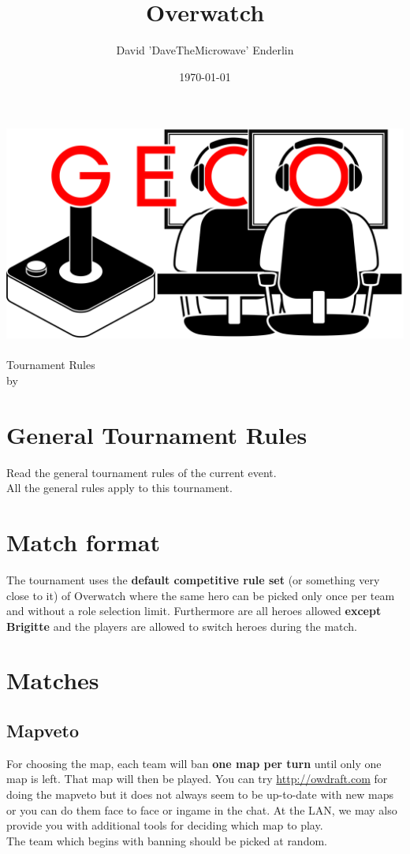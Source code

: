 \documentclass{article}
\title{Overwatch}
\author{David 'DaveTheMicrowave' Enderlin}
\date{\today}
\begin{document}
\makeatletter
\begin{titlepage}
\centering
\includegraphics[scale=0.075]{GECo.png}\\
\LARGE \@title\\ Tournament Rules\\ \normalsize by \@author\\ \@date
\end{titlepage}
\makeatother

\clearpage

\tableofcontents
\clearpage

\section{General Tournament Rules}
Read the general tournament rules of the current event.\\
All the general rules apply to this tournament.

\section{Match format}
The tournament uses the \textbf{default competitive rule set} (or something very close to it) of Overwatch where the same hero can be picked only once per team and without a role selection limit. Furthermore are all heroes allowed \textbf{except Brigitte} and the players are allowed to switch heroes during the match.

\section{Matches}
\subsection{Mapveto}
For choosing the map, each team will ban \textbf{one map per turn} until only one map is left. That map will then be played.
You can try \url{http://owdraft.com} for doing the mapveto but it does not always seem to be up-to-date with new maps
or you can do them face to face or ingame in the chat. At the LAN, we may also provide you with additional tools
for deciding which map to play. \\
The team which begins with banning should be picked at random.
\end{document}
